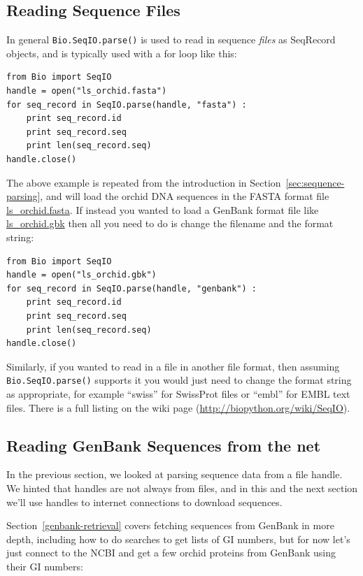 \documentclass{report}
\begin{document}
\subsection{Reading Sequence Files}

In general \verb|Bio.SeqIO.parse()| is used to read in sequence {\it files} as SeqRecord objects, and is typically used with a for loop like this:

\begin{verbatim}
from Bio import SeqIO
handle = open("ls_orchid.fasta")
for seq_record in SeqIO.parse(handle, "fasta") :
    print seq_record.id
    print seq_record.seq
    print len(seq_record.seq)
handle.close()
\end{verbatim}

The above example is repeated from the introduction in Section~\ref{sec:sequence-parsing}, and will load the orchid DNA sequences in the FASTA format file \href{http://biopython.org/DIST/docs/tutorial/examples/ls_orchid.fasta}{ls\_orchid.fasta}.  If instead you wanted to load a GenBank format file like \href{http://biopython.org/DIST/docs/tutorial/examples/ls_orchid.gbk}{ls\_orchid.gbk} then all you need to do is change the filename and the format string:

\begin{verbatim}
from Bio import SeqIO
handle = open("ls_orchid.gbk")
for seq_record in SeqIO.parse(handle, "genbank") :
    print seq_record.id
    print seq_record.seq
    print len(seq_record.seq)
handle.close()
\end{verbatim}

Similarly, if you wanted to read in a file in another file format, then assuming \verb|Bio.SeqIO.parse()| supports it you would just need to change the format string as appropriate, for example ``swiss'' for SwissProt files or ``embl'' for EMBL text files. There is a full listing on the wiki page (\url{http://biopython.org/wiki/SeqIO}).

\subsection{Reading GenBank Sequences from the net}
\label{sec:SeqIO_GenBank_Online}

In the previous section, we looked at parsing sequence data from a file handle.
We hinted that handles are not always from files, and in this and the next section we'll use handles to internet connections to download sequences.

Section~\ref{genbank-retrieval} covers fetching sequences from GenBank in more depth, including how to do searches to get lists of GI numbers, but for now let's just connect to the NCBI and get a few orchid proteins from GenBank using their GI numbers:
\end{document}
